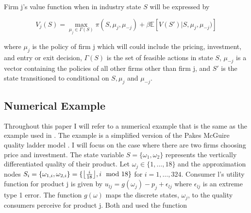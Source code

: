 \documentclass[12pt]{article}
\DeclarePairedDelimiter\floor{\lfloor}{\rfloor}
\begin{document}

Firm j's value function when in industry state $S$ will be expressed by

\begin{equation*}
  V_j(S)=\max_{\mu_j \in \Gamma(S)} \pi(S, \mu_j, \mu_{-j}) + \beta\mathbb{E}[V(S')|S,\mu_{j},\mu_{-j})]
\end{equation*}

where $\mu_j$ is the policy of firm j which will could include the pricing, investment, and entry or exit decision, $\Gamma(S)$ is the set of feasible actions in state $S$, $\mu_{-j}$ is a vector containing the policies of all other firms other than firm j, and $S'$ is the state transitioned to conditional on $S,\mu_{j}$ and $\mu_{-j}$.

\subsection{Numerical Example}

Throughout this paper I will refer to a numerical example that is the same as the example used in \citet{2012_Doraszelski_Judd_QuanEcon}. The example is a simplified version of the Pakes McGuire quality ladder model \citep{2012_Doraszelski_Judd_QuanEcon}. I will focus on the case where there are two firms choosing price and investment. The state variable $S=\{\omega_1,\omega_2\}$ represents the vertically differentiated quality of their product. Let $\omega_j \in \{1, \dots ,18 \}$ and the approximation nodes $S_i=\{\omega_{1,i},\omega_{2,i}\}=\{\floor*{\frac{i}{18}},i \mod 18\}$ for $i=1,\dots,324$. Consumer l's utility function for product j is given by $u_{lj}=g(\omega_j) - p_j + \epsilon_{lj}$ where $\epsilon_{lj}$ is an extreme type 1 error. The function $g(\omega)$ maps the discrete states, $\omega_j$, to the quality consumers perceive for product j. Both \citet{1992_Pakes_McGuire_NBER} and \citet{2012_Doraszelski_Judd_QuanEcon} used the function
\end{document}
